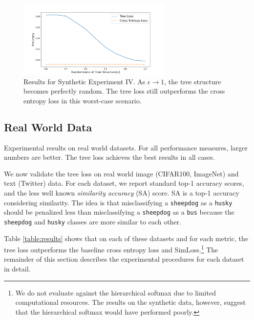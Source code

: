 \documentclass[twoside]{article}
\begin{document}
\begin{figure}
\includegraphics[width=\columnwidth,height=1.5in]{fig/new_img/loss_vs_structure.png}
\caption{
Results for Synthetic Experiment IV.
As $\epsilon\to1$, 
the tree structure becomes perfectly random.
The tree loss still outperforms the cross entropy loss in this worst-case scenario.
}  
\label{fig:synth:eps}
\end{figure}




\subsection{Real World Data}

\begin{table}
    \centering
    
    \caption{Experimental results on real world datasets.  For all performance measures, larger numbers are better.  The tree loss achieves the best results in all cases.}
    \label{table:results}
\end{table}

We now validate the tree loss on real world image (CIFAR100, ImageNet) and text (Twitter) data.
For each dataset, we report standard top-1 accuracy scores,
and the less well known \emph{similarity accuracy} (SA) score.
SA is a top-1 accuracy considering similarity.
The idea is that misclassifying a \texttt{sheepdog} as a \texttt{husky} should be penalized less than misclassifying a \texttt{sheepdog} as a \texttt{bus} because the \texttt{sheepdog} and \texttt{husky} classes are more similar to each other.

Table \ref{table:results} shows that on each of these datasets and for each metric,
the tree loss outperforms the baseline cross entropy loss and SimLoss.\footnote{We do not evaluate against the hierarchical softmax due to limited computational resources.  The results on the synthetic data, however, suggest that the hierarchical softmax would have performed poorly.}
The remainder of this section describes the experimental procedures for each dataset in detail.
\end{document}
